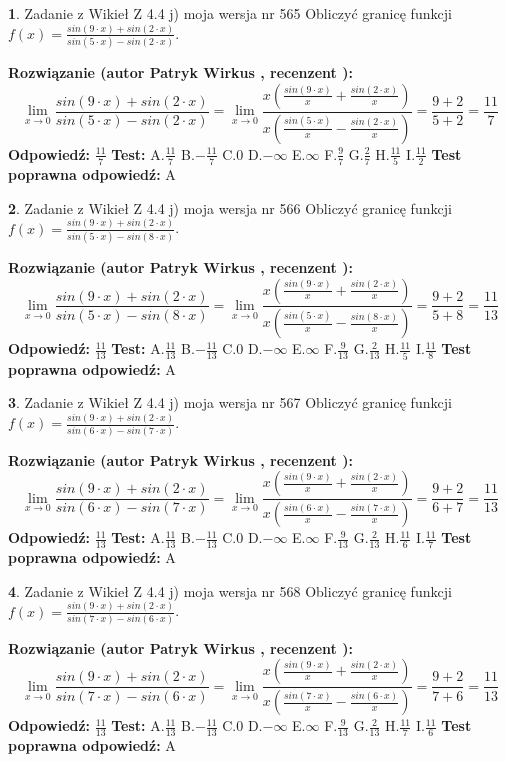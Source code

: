 \documentclass[12pt, a4paper]{article}
\theoremstyle{definition} %
\newtheorem{zad}{}
\newcommand{\zadStart}[1]{\begin{zad}#1\newline}
\newcommand{\zadStop}{\end{zad}}
\newcommand{\rozwStart}[2]{\noindent \textbf{Rozwiązanie (autor #1 , recenzent #2): }\newline}
\newcommand{\rozwStop}{\newline}
\newcommand{\odpStart}{\noindent \textbf{Odpowiedź:}\newline}
\newcommand{\odpStop}{\newline}
\newcommand{\testStart}{\noindent \textbf{Test:}\newline}
\newcommand{\testStop}{\newline}
\newcommand{\kluczStart}{\noindent \textbf{Test poprawna odpowiedź:}\newline}
\newcommand{\kluczStop}{\newline}
\begin{document}
\zadStart{Zadanie z Wikieł Z 4.4 j) moja wersja nr 565}
Obliczyć granicę funkcji $f(x)=\frac{sin(9\cdot x) +sin(2\cdot x)}{sin(5\cdot x) -sin(2\cdot x)}$.
\zadStop
\rozwStart{Patryk Wirkus}{}
$$\lim\limits_{x\to 0}\frac{sin(9\cdot x) +sin(2\cdot x)}{sin(5\cdot x) -sin(2\cdot x)}=\lim\limits_{x\to 0}\frac{x(\frac{sin(9\cdot x)}{x}+\frac{sin(2\cdot x)}{x})}{x(\frac{sin(5\cdot x)}{x}-\frac{sin(2\cdot x)}{x})}=\frac{9+2}{5+2} = \frac{11}{7}$$
\rozwStop
\odpStart
$\frac{11}{7}$
\odpStop
\testStart
A.$\frac{11}{7}$
B.$-\frac{11}{7}$
C.$0$
D.$-\infty$
E.$\infty$
F.$\frac{9}{7}$
G.$\frac{2}{7}$
H.$\frac{11}{5}$
I.$\frac{11}{2}$
\testStop
\kluczStart
A
\kluczStop



\zadStart{Zadanie z Wikieł Z 4.4 j) moja wersja nr 566}
Obliczyć granicę funkcji $f(x)=\frac{sin(9\cdot x) +sin(2\cdot x)}{sin(5\cdot x) -sin(8\cdot x)}$.
\zadStop
\rozwStart{Patryk Wirkus}{}
$$\lim\limits_{x\to 0}\frac{sin(9\cdot x) +sin(2\cdot x)}{sin(5\cdot x) -sin(8\cdot x)}=\lim\limits_{x\to 0}\frac{x(\frac{sin(9\cdot x)}{x}+\frac{sin(2\cdot x)}{x})}{x(\frac{sin(5\cdot x)}{x}-\frac{sin(8\cdot x)}{x})}=\frac{9+2}{5+8} = \frac{11}{13}$$
\rozwStop
\odpStart
$\frac{11}{13}$
\odpStop
\testStart
A.$\frac{11}{13}$
B.$-\frac{11}{13}$
C.$0$
D.$-\infty$
E.$\infty$
F.$\frac{9}{13}$
G.$\frac{2}{13}$
H.$\frac{11}{5}$
I.$\frac{11}{8}$
\testStop
\kluczStart
A
\kluczStop



\zadStart{Zadanie z Wikieł Z 4.4 j) moja wersja nr 567}
Obliczyć granicę funkcji $f(x)=\frac{sin(9\cdot x) +sin(2\cdot x)}{sin(6\cdot x) -sin(7\cdot x)}$.
\zadStop
\rozwStart{Patryk Wirkus}{}
$$\lim\limits_{x\to 0}\frac{sin(9\cdot x) +sin(2\cdot x)}{sin(6\cdot x) -sin(7\cdot x)}=\lim\limits_{x\to 0}\frac{x(\frac{sin(9\cdot x)}{x}+\frac{sin(2\cdot x)}{x})}{x(\frac{sin(6\cdot x)}{x}-\frac{sin(7\cdot x)}{x})}=\frac{9+2}{6+7} = \frac{11}{13}$$
\rozwStop
\odpStart
$\frac{11}{13}$
\odpStop
\testStart
A.$\frac{11}{13}$
B.$-\frac{11}{13}$
C.$0$
D.$-\infty$
E.$\infty$
F.$\frac{9}{13}$
G.$\frac{2}{13}$
H.$\frac{11}{6}$
I.$\frac{11}{7}$
\testStop
\kluczStart
A
\kluczStop



\zadStart{Zadanie z Wikieł Z 4.4 j) moja wersja nr 568}
Obliczyć granicę funkcji $f(x)=\frac{sin(9\cdot x) +sin(2\cdot x)}{sin(7\cdot x) -sin(6\cdot x)}$.
\zadStop
\rozwStart{Patryk Wirkus}{}
$$\lim\limits_{x\to 0}\frac{sin(9\cdot x) +sin(2\cdot x)}{sin(7\cdot x) -sin(6\cdot x)}=\lim\limits_{x\to 0}\frac{x(\frac{sin(9\cdot x)}{x}+\frac{sin(2\cdot x)}{x})}{x(\frac{sin(7\cdot x)}{x}-\frac{sin(6\cdot x)}{x})}=\frac{9+2}{7+6} = \frac{11}{13}$$
\rozwStop
\odpStart
$\frac{11}{13}$
\odpStop
\testStart
A.$\frac{11}{13}$
B.$-\frac{11}{13}$
C.$0$
D.$-\infty$
E.$\infty$
F.$\frac{9}{13}$
G.$\frac{2}{13}$
H.$\frac{11}{7}$
I.$\frac{11}{6}$
\testStop
\kluczStart
A
\kluczStop
\end{document}
